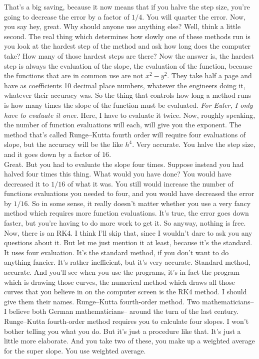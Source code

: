 That's a big saving, because it now means that if you halve the step size,
you're going to decrease the error by a factor of $1/4$.
You will quarter the error.
Now, you say hey, great. Why should anyone use anything else?
Well, think a little second.
The real thing which determines how slowly one of these methods
run is you look at the hardest step of the method and ask how long does the computer take?
How many of those hardest steps are there?
Now the answer is, the hardest step is always
the evaluation of the slope, the evaluation of the function,
because the functions that are in common use are not $x^2 - y^2$.
They take half a page and have as coefficients 10 decimal place numbers, whatever
the engineers doing it, whatever their accuracy was.
So the thing that controls how long a method runs is how many times the slope of the function must be evaluated.
\emph{For Euler, I only have to evaluate it once.}
Here, I have to evaluate it twice. Now, roughly speaking, the number
of function evaluations will each, will give you the exponent.
The method that's called Runge--Kutta fourth order will
require four evaluations of slope,
but the accuracy will be the like $h^4$. Very accurate.
You halve the step size, and it goes down by a factor of $16$. \\
Great. But you had to evaluate the slope four times.
Suppose instead you had halved four times this thing.
What would you have done?
You would have decreased it to $1/16$ of what it was.
You still would increase the number of functions evaluations you needed to four,
and you would have decreased the error by $1/16$.
So in some sense, it really doesn't matter whether you use a very fancy method which requires
more function evaluations.
It's true, the error goes down faster, but you're having to do more work to get it.
So anyway, nothing is free.
Now, there is an RK4.
I think I'll skip that, since I wouldn't dare to ask you any questions about it.
But let me just mention it at least, because it's the standard.
It uses four evaluation. It's the standard method, if you don't
want to do anything fancier.
It's rather inefficient, but it's very accurate. Standard method, accurate.
And you'll see when you use the programs, it's in fact the program which is drawing
those curves, the numerical method which draws all
those curves that you believe in on the computer screen is the RK4 method.
I should give them their names.
Runge--Kutta fourth-order method.
Two mathematicians-- I believe both German mathematicians--
around the turn of the last century.
Runge--Kutta fourth-order method requires you to calculate four slopes.
I won't bother telling you what you do.
But it's just a procedure like that.
It's just a little more elaborate.
And you take two of these, you make up a weighted average for the super slope.
You use weighted average.

